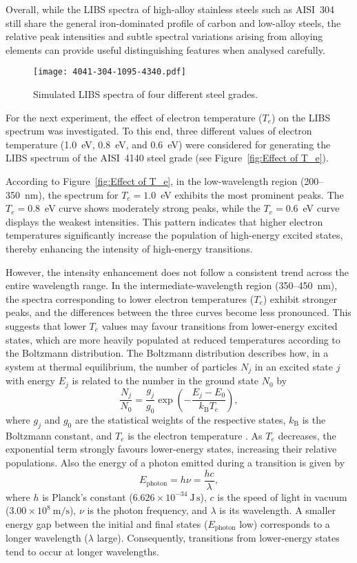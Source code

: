\documentclass[12pt,a4paper]{article}
\begin{document}
   
 	
 	Overall, while the LIBS spectra of high-alloy stainless steels such as AISI~304 still share the general iron-dominated profile of carbon and low-alloy steels, the relative peak intensities and subtle spectral variations arising from alloying elements can provide useful distinguishing features when analysed carefully.
 	
	
	\begin{figure}[h!]
		\centering
		\texttt{[image: 4041-304-1095-4340.pdf]}
		\caption{Simulated LIBS spectra of four different steel grades.}
		\label{fig:4041-304-1095-4340}
	\end{figure} 
	

	For the next experiment, the effect of electron temperature ($T_e$) on the LIBS spectrum was investigated. To this end, three different values of electron temperature (1.0~eV, 0.8~eV, and 0.6~eV) were considered for generating the LIBS spectrum of the AISI~4140 steel grade (see Figure~\ref{fig:Effect of T_e}).  
	
	According to Figure~\ref{fig:Effect of T_e}, in the low-wavelength region (200--350~nm), the spectrum for $T_e = 1.0$~eV exhibits the most prominent peaks. The $T_e = 0.8$~eV curve shows moderately strong peaks, while the $T_e = 0.6$~eV curve displays the weakest intensities. This pattern indicates that higher electron temperatures significantly increase the population of high-energy excited states, thereby enhancing the intensity of high-energy transitions.  
	
	However, the intensity enhancement does not follow a consistent trend across the entire wavelength range. In the intermediate-wavelength region (350--450~nm), the spectra corresponding to lower electron temperatures ($T_e$) exhibit stronger peaks, and the differences between the three curves become less pronounced. This suggests that lower $T_e$ values may favour transitions from lower-energy excited states, which are more heavily populated at reduced temperatures according to the Boltzmann distribution. The Boltzmann distribution describes how, in a system at thermal equilibrium, the number of particles $N_j$ in an excited state $j$ with energy $E_j$ is related to the number in the ground state $N_0$ by  
	\[
	\frac{N_j}{N_0} = \frac{g_j}{g_0} \exp\left(-\frac{E_j - E_0}{k_\mathrm{B} T_e}\right),
	\]  
	where $g_j$ and $g_0$ are the statistical weights of the respective states, $k_\mathrm{B}$ is the Boltzmann constant, and $T_e$ is the electron temperature \cite{Cremers2013LIBSHandbook}. As $T_e$ decreases, the exponential term strongly favours lower-energy states, increasing their relative populations. Also the  energy of a photon emitted during a transition is given by  
	\[
	E_{\text{photon}} = h\nu = \frac{hc}{\lambda},
	\]  
	where \(h\) is Planck’s constant (\(6.626\times10^{-34}~\mathrm{J\,s}\)), \(c\) is the speed of light in vacuum (\(3.00\times10^8~\mathrm{m/s}\)), \(\nu\) is the photon frequency, and \(\lambda\) is its wavelength. A smaller energy gap between the initial and final states (\(E_{\text{photon}}\) low) corresponds to a longer wavelength (\(\lambda\) large). Consequently, transitions from lower-energy states tend to occur at longer wavelengths.  
	
\end{document}
